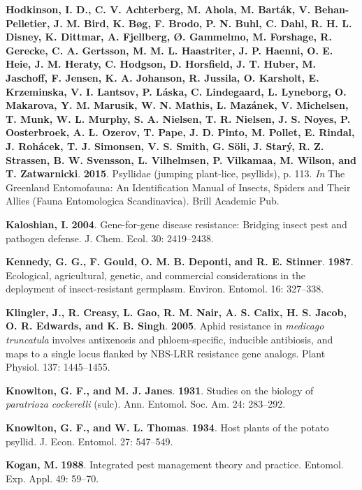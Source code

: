 \documentclass[]{article}
\begin{document}
\leavevmode\hypertarget{ref-Hodkinson2015}{}%
\textbf{Hodkinson, I. D., C. V. Achterberg, M. Ahola, M. Barták, V.
Behan-Pelletier, J. M. Bird, K. Bøg, F. Brodo, P. N. Buhl, C. Dahl, R.
H. L. Disney, K. Dittmar, A. Fjellberg, Ø. Gammelmo, M. Forshage, R.
Gerecke, C. A. Gertsson, M. M. L. Haastriter, J. P. Haenni, O. E. Heie,
J. M. Heraty, C. Hodgson, D. Horsfield, J. T. Huber, M. Jaschoff, F.
Jensen, K. A. Johanson, R. Jussila, O. Karsholt, E. Krzeminska, V. I.
Lantsov, P. Láska, C. Lindegaard, L. Lyneborg, O. Makarova, Y. M.
Marusik, W. N. Mathis, L. Mazánek, V. Michelsen, T. Munk, W. L. Murphy,
S. A. Nielsen, T. R. Nielsen, J. S. Noyes, P. Oosterbroek, A. L. Ozerov,
T. Pape, J. D. Pinto, M. Pollet, E. Rindal, J. Rohácek, T. J. Simonsen,
V. S. Smith, G. Söli, J. Starý, R. Z. Strassen, B. W. Svensson, L.
Vilhelmsen, P. Vilkamaa, M. Wilson, and T. Zatwarnicki}. \textbf{2015}.
Psyllidae (jumping plant-lice, psyllids), p. 113. \emph{In} The
Greenland Entomofauna: An Identification Manual of Insects, Spiders and
Their Allies (Fauna Entomologica Scandinavica). Brill Academic Pub.

\leavevmode\hypertarget{ref-Kaloshian2004}{}%
\textbf{Kaloshian, I.} \textbf{2004}. Gene-for-gene disease resistance:
Bridging insect pest and pathogen defense. J. Chem. Ecol. 30:
2419--2438.

\leavevmode\hypertarget{ref-Kennedy1987}{}%
\textbf{Kennedy, G. G., F. Gould, O. M. B. Deponti, and R. E. Stinner}.
\textbf{1987}. Ecological, agricultural, genetic, and commercial
considerations in the deployment of insect-resistant germplasm. Environ.
Entomol. 16: 327--338.

\leavevmode\hypertarget{ref-Klingler2005}{}%
\textbf{Klingler, J., R. Creasy, L. Gao, R. M. Nair, A. S. Calix, H. S.
Jacob, O. R. Edwards, and K. B. Singh}. \textbf{2005}. Aphid resistance
in \emph{medicago truncatula} involves antixenosis and phloem-specific,
inducible antibiosis, and maps to a single locus flanked by NBS-LRR
resistance gene analogs. Plant Physiol. 137: 1445--1455.

\leavevmode\hypertarget{ref-Knowlton1931}{}%
\textbf{Knowlton, G. F., and M. J. Janes}. \textbf{1931}. Studies on the
biology of \emph{paratrioza cockerelli} (sulc). Ann. Entomol. Soc. Am.
24: 283--292.

\leavevmode\hypertarget{ref-Knowlton1934}{}%
\textbf{Knowlton, G. F., and W. L. Thomas}. \textbf{1934}. Host plants
of the potato psyllid. J. Econ. Entomol. 27: 547--549.

\leavevmode\hypertarget{ref-Kogan1988}{}%
\textbf{Kogan, M.} \textbf{1988}. Integrated pest management theory and
practice. Entomol. Exp. Appl. 49: 59--70.
\end{document}
